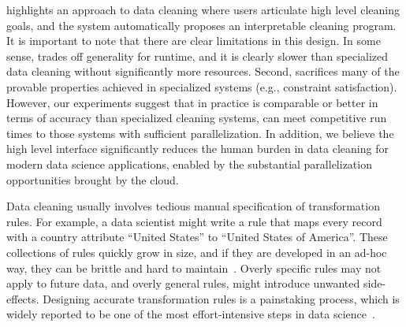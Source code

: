 

\sys highlights an approach to data cleaning where users articulate high level cleaning goals, and the system automatically proposes an interpretable cleaning program.
It is important to note that there are clear limitations in this design.
In some sense, \sys trades off generality for runtime, and it is clearly slower than specialized data cleaning without significantly more resources.
Second, \sys sacrifices many of the provable properties achieved in specialized systems (e.g., constraint satisfaction). 
However, our experiments suggest that in practice \sys is comparable or better in terms of accuracy than specialized cleaning systems, can meet competitive run times to those systems with sufficient parallelization. In addition, we believe the high level interface significantly reduces the human burden in data cleaning for modern data science applications, enabled by the substantial parallelization opportunities brought by the cloud. 





Data cleaning usually involves tedious manual specification of transformation rules.
For example, a data scientist might write a rule that maps every record with a \textsf{country} attribute ``United States'' to ``United States of America''.
These collections of rules quickly grow in size, and if they are developed in an ad-hoc way, they can be brittle and hard to maintain~\cite{krishnan2016hilda}.
Overly specific rules may not apply to future data, and overly general rules, might introduce unwanted side-effects.
Designing accurate transformation rules is a painstaking process, which is widely reported to be one of the most effort-intensive steps in data science~\cite{nytimes}.

